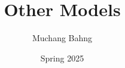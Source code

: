 \documentclass{article}
\begin{document}
\title{Other Models}
\author{Muchang Bahng}
\date{Spring 2025}

\maketitle
\tableofcontents
\pagebreak








\end{document}
